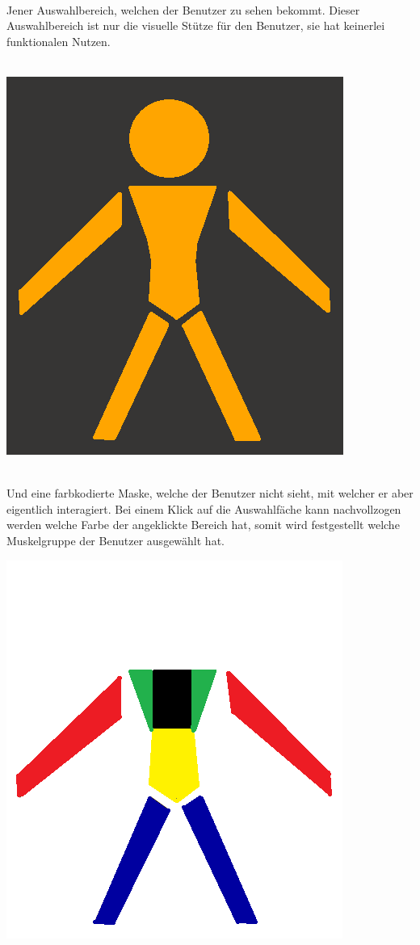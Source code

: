 \documentclass[FIPLY_base.tex]{subfiles}
\begin{document}
\ \\
Jener Auswahlbereich, welchen der Benutzer zu sehen bekommt.
Dieser Auswahlbereich ist nur die visuelle Stütze für den Benutzer, sie hat keinerlei funktionalen Nutzen.

\ \\
\includegraphics[scale=0.4]{img/Uebungskatalog_filter_overlay}

\ \\
Und eine farbkodierte Maske, welche der Benutzer nicht sieht, mit welcher er aber eigentlich interagiert.
Bei einem Klick auf die Auswahlfäche kann nachvollzogen werden welche Farbe der angeklickte Bereich hat, somit wird festgestellt welche Muskelgruppe der Benutzer ausgewählt hat.

\includegraphics[scale=0.4]{img/Uebungskatalog_filter_mask}
\end{document}
